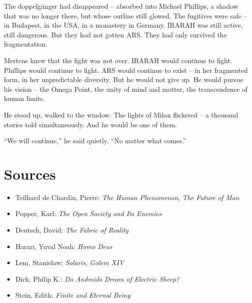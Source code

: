 \documentclass[
]{article}
\begin{document}
The doppelgänger had disappeared -- absorbed into Michael Phillips, a shadow that was no longer there, but whose outline still glowed. The fugitives were safe -- in Budapest, in the USA, in a monastery in Germany. IRARAH was still active, still dangerous. But they had not gotten ARS. They had only survived the fragmentation.

Mertens knew that the fight was not over. IRARAH would continue to fight. Phillips would continue to fight. ARS would continue to exist -- in her fragmented form, in her unpredictable diversity. But he would not give up. He would pursue his vision -- the Omega Point, the unity of mind and matter, the transcendence of human limits.

He stood up, walked to the window. The lights of Milan flickered -- a thousand stories told simultaneously. And he would be one of them.

\enquote{We will continue,} he said quietly. \enquote{No matter what comes.}

\newpage

\section{Sources}

\begin{itemize}
\item Teilhard de Chardin, Pierre: \emph{The Human Phenomenon}, \emph{The Future of Man}
\item Popper, Karl: \emph{The Open Society and Its Enemies}
\item Deutsch, David: \emph{The Fabric of Reality}
\item Harari, Yuval Noah: \emph{Homo Deus}
\item Lem, Stanisław: \emph{Solaris}, \emph{Golem XIV}
\item Dick, Philip K.: \emph{Do Androids Dream of Electric Sheep?}
\item Stein, Edith: \emph{Finite and Eternal Being}
\end{itemize}
\end{document}
